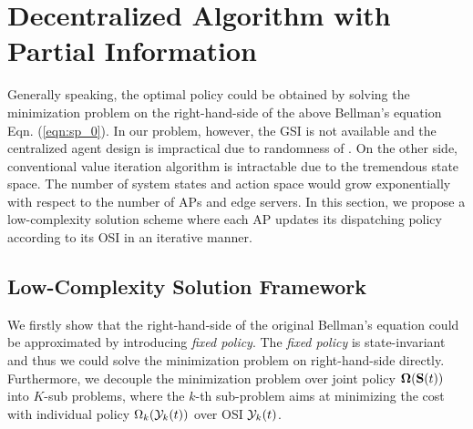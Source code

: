\section{Decentralized Algorithm with Partial Information}
Generally speaking, the optimal policy could be obtained by solving the minimization problem on the right-hand-side of the above Bellman's equation Eqn. (\ref{eqn:sp_0}).
In our problem, however, the GSI is not available and the centralized agent design is impractical due to randomness of \brlatency.
On the other side, conventional value iteration algorithm is intractable due to the tremendous state space.
The number of system states and action space would grow exponentially with respect to the number of APs and edge servers.
In this section, we propose a low-complexity solution scheme where each AP updates its dispatching policy according to its OSI in an iterative manner.

\subsection{Low-Complexity Solution Framework}



We firstly show that the right-hand-side of the original Bellman's equation could be approximated by introducing \emph{fixed policy}.
The \emph{fixed policy} is state-invariant and thus we could solve the minimization problem on right-hand-side directly.
Furthermore, we decouple the minimization problem over joint policy $\boldsymbol{\Omega}(\mathbf{S}(t))$ into $K$-sub problems, where the $k$-th sub-problem aims at minimizing the cost with individual policy $\Omega_{k}(\mathcal{Y}_{k}(t))$ over OSI $\mathcal{Y}_{k}(t)$.

